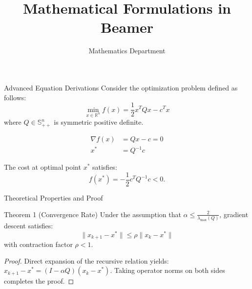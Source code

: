 \documentclass{beamer}
\title{Mathematical Formulations in Beamer}
\author{Mathematics Department}
\begin{document}
\begin{frame}{Advanced Equation Derivations}
  Consider the optimization problem defined as follows:
  \begin{equation}
    \min_{x \in \mathbb{R}^n} f(x) = \frac{1}{2} x^T Q x - c^T x
  \end{equation}
  where $Q \in \mathbb{S}_{++}^n$ is symmetric positive definite.

  \pause

  \begin{align*}
    \nabla f(x) &= Q x - c = 0 \\
    x^* &= Q^{-1} c
  \end{align*}

  The cost at optimal point $x^*$ satisfies:
  $$f(x^*) = -\frac{1}{2} c^T Q^{-1} c < 0.$$
\end{frame}

\begin{frame}{Theoretical Properties and Proof}
  \begin{block}{Theorem 1 (Convergence Rate)}
    Under the assumption that $\alpha \le \frac{2}{\lambda_{\max}(Q)}$, gradient descent satisfies:
    \begin{equation*}
      \|x_{k+1} - x^*\| \le \rho \|x_k - x^*\|
    \end{equation*}
    with contraction factor $\rho < 1$.
  \end{block}

  \begin{proof}
    Direct expansion of the recursive relation yields:
    $x_{k+1} - x^* = (I - \alpha Q)(x_k - x^*).$
    Taking operator norms on both sides completes the proof.
  \end{proof}
\end{frame}
\end{document}
